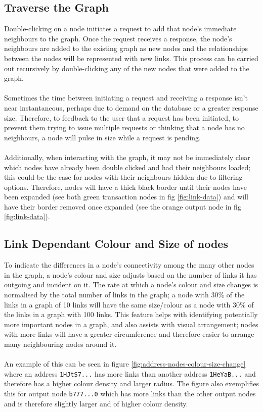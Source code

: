 \subsection{Traverse the Graph}
Double-clicking on a node initiates a request to add that node's immediate neighbours to the graph. Once the request receives a response, the node's neighbours are added to the existing graph as new nodes and the relationships between the nodes will be represented with new links. This process can be carried out recursively by double-clicking any of the new nodes that were added to the graph.
\\\\
Sometimes the time between initiating a request and receiving a response isn't near instantaneous, perhaps due to demand on the database or a greater response size. Therefore, to feedback to the user that a request has been initiated, to prevent them trying to issue multiple requests or thinking that a node has no neighbours, a node will pulse in size while a request is pending. 
\\\\
Additionally, when interacting with the graph, it may not be immediately clear which nodes have already been double clicked and had their neighbours loaded; this could be the case for nodes with their neighbours hidden due to filtering options. Therefore, nodes will have a thick black border until their nodes have been expanded (see both green transaction nodes in fig \ref{fig:link-data}) and will have their border removed once expanded (see the orange output node in fig \ref{fig:link-data}).

\subsection{Link Dependant Colour and Size of nodes}
To indicate the differences in a node's connectivity among the many other nodes in the graph, a node's colour and size adjusts based on the number of links it has outgoing and incident on it. The rate at which a node's colour and size changes is normalised by the total number of links in the graph; a node with 30\% of the links in a graph of 10 links will have the same size/colour as a node with 30\% of the links in a graph with 100 links. This feature helps with identifying potentially more important nodes in a graph, and also assists with visual arrangement; nodes with more links will have a greater circumference and therefore easier to arrange many neighbouring nodes around it.
\\\\
An example of this can be seen in figure \ref{fig:address-nodes-colour-size-change} where an address \texttt{1HJtS7...} has more links than another address \texttt{1HeYaB...} and therefore has a higher colour density and larger radius. The figure also exemplifies this for output node \texttt{b777...0} which has more links than the other output nodes and is therefore slightly larger and of higher colour density.

